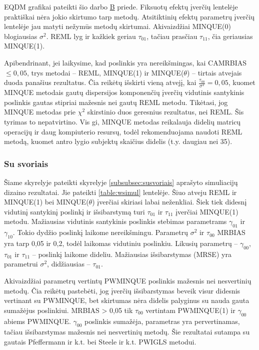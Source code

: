 \documentclass[11pt,a4paper]{article}
\begin{document}
\indent EQDM grafikai pateikti šio darbo \hyperlink{appendixb}{B} priede. Fiksuotų efektų įverčių lentelėje praktiškai nėra jokio skirtumo tarp metodų. Atsitiktinių efektų parametrų įverčių lentelėje jau matyti nežymūs metodų skirtumai. Akivaizdžiai MINQUE(0) blogiausias $\sigma^2$. REML lyg ir kažkiek geriau $\tau_{01}$, tačiau prasčiau $\tau_{11}$, čia geriausias MINQUE(1). 

\indent Apibendrinant, jei laikysime, kad poslinkis yra nereikšmingas, kai CAMRBIAS $\leq 0,05$, trys metodai -- REML, MINQUE(1) ir 
MINQUE($\theta$) -- tirtais atvejais duoda panašius rezultatus. Čia reikėtų išskirti vieną atvejį, kai $\frac{\tau_{00}}{\sigma^2}=0,05$, kuomet MINQUE metodais gautų dispersijos komponenčių įverčių vidutinis santykinis poslinkis gautas stipriai mažesnis nei gautų REML metodu. Tikėtasi, jog MINQUE metodas prie $\chi^2$ skirstinio duos geresnius rezultatus, nei REML. Šis tyrimas to nepatvirtino. Vis gi, MINQUE metodas reikalauja didelių matricų operacijų ir daug kompiuterio resursų, todėl rekomenduojama naudoti REML metodą, kuomet antro lygio subjektų skaičius didelis (t.y. daugiau nei 35).

\subsubsection*{Su svoriais}
\indent Šiame skyrelyje pateikti skyrelyje \ref{subsubsec:susvoriais} aprašyto simuliacijų dizaino rezultatai. Jie pateikti \ref{table:wsimul} lentelėje. Šiuo atveju REML ir MINQUE(1) bei MINQUE($\theta$) įverčiai skiriasi labai neženkliai. Šiek tiek didesnį vidutinį santykinį poslinkį ir išsibarstymą turi $\tau_{01}$ ir $\tau_{11}$ įverčiai MINQUE(1) metodu. Mažiausias vidutinis santykinis poslinkis stebimas parametrams $\gamma_{01}$ ir $\gamma_{10}$. Tokio dydžio poslinkį laikome nereikšmingu. Parametrų $\sigma^2$ ir $\tau_{00}$ MRBIAS yra tarp 0,05 ir 0,2, todėl laikomas vidutiniu poslinkiu. Likusių parametrų -- $\gamma_{00}$, $\tau_{01}$ ir $\tau_{11}$ -- poslinkį laikome dideliu. Mažiausias išsibarstymas (MRSE) yra parametrui $\sigma^2$, didžiausias -- $\tau_{01}$. 

\indent Akivaizdžiai parametrų vertintų PWMINQUE poslinkis mažesnis nei nesvertinių metodų. Čia reikėtų pastebėti, jog įverčių išsibarstymas beveik visur didesnis vertinant su PWMINQUE, bet skirtumas nėra didelis palyginus su nauda gauta sumažėjus poslinkiui.    MRBIAS > 0,05 tik $\tau_{00}$ vertintam PWMINQUE(1) ir $\gamma_{00}$ abiems PWMINQUE. $\gamma_{00}$ poslinkis sumažėja, parametras yra pervertinamas, tačiau išsibarstymas mažesnis nei nesvertinių metodų. Šie rezultatai sutampa su gautais  Pfeffermann ir k.t.\cite{pfeff} bei Steele ir k.t.\cite{mlwin} PWIGLS metodui.
\end{document}
